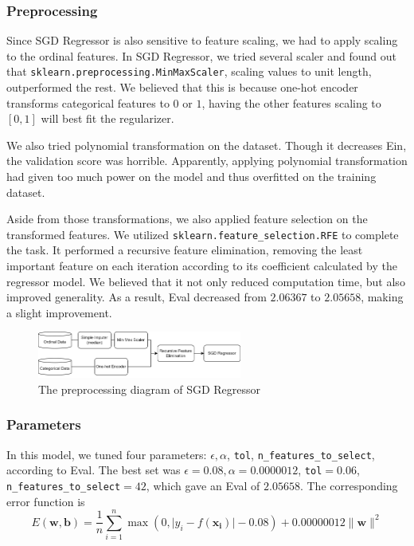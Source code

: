 \documentclass[10pt,letterpaper]{article}
\begin{document}
\subsubsection{Preprocessing}

Since SGD Regressor is also sensitive to feature scaling, we had to apply scaling to the ordinal features. In SGD Regressor, we tried several scaler and found out that \texttt{sklearn.preprocessing.MinMaxScaler}, scaling values to unit length, outperformed the rest. We believed that this is because one-hot encoder transforms categorical features to $0$ or $1$, having the other features scaling to $[0, 1]$ will best fit the regularizer. 

We also tried polynomial transformation on the dataset. Though it decreases Ein, the validation score was horrible. Apparently, applying polynomial transformation had given too much power on the model and thus overfitted on the training dataset. 

Aside from those transformations, we also applied feature selection on the transformed features. We utilized \texttt{sklearn.feature\_selection.RFE} to complete the task. It performed a recursive feature elimination, removing the least important feature on each iteration according to its coefficient calculated by the regressor model. We believed that it not only reduced computation time, but also improved generality. As a result, Eval decreased from $2.06367$ to $2.05658$, making a slight improvement. 

\begin{figure}[h]
	\centering
	\includegraphics[width=0.6\textwidth]{SGDregressor-diagram.png}
	\caption{The preprocessing diagram of SGD Regressor}
	\label{fig:SGDRegressorDiagram}
\end{figure}

\subsubsection{Parameters}

In this model, we tuned four parameters: $\epsilon, \alpha$, \texttt{tol}, \texttt{n\_features\_to\_select}, according to Eval.
The best set was $\epsilon=0.08, \alpha=0.0000012$, \texttt{tol}$=0.06$, \texttt{n\_features\_to\_select}$=42$, which gave an Eval of $2.05658$. The corresponding error function is 
$$
	E(\mathbf{w}, \mathbf{b}) = \frac{1}{n}\sum_{i=1}^n \max(0, \lvert y_i - f(\mathbf{x_i})\rvert - 0.08) + 0.00000012\lVert\mathbf{w}\rVert^2
$$
\end{document}
